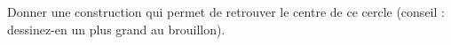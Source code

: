 
\begin{exercice}\label{exosmath-0933}

    Donner une construction qui permet de retrouver le centre de ce cercle (conseil : dessinez-en un plus grand au brouillon).
\begin{center}
   
\end{center}

\end{exercice}
